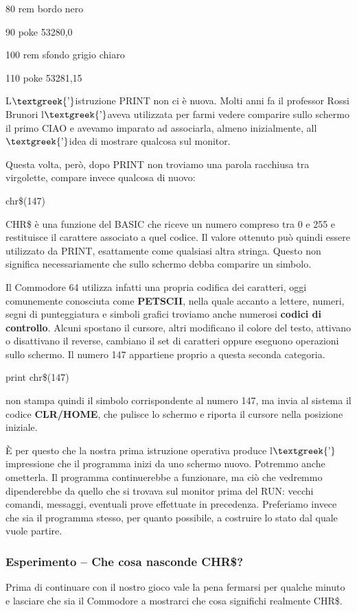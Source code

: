 \documentclass{article}
\begin{document}
80 rem bordo nero

90 poke 53280,0

100 rem sfondo grigio chiaro

110 poke 53281,15

L$\text{\textgreek{’}}$istruzione PRINT non ci è nuova. Molti anni fa il professor Rossi Brunori
l$\text{\textgreek{’}}$aveva utilizzata per farmi vedere comparire sullo schermo il primo CIAO e avevamo imparato ad
associarla, almeno inizialmente, all$\text{\textgreek{’}}$idea di mostrare qualcosa sul monitor.

Questa volta, però, dopo PRINT non troviamo una parola racchiusa tra virgolette, compare invece qualcosa di nuovo:

chr\$(147)

CHR\$ è una funzione del BASIC che riceve un numero compreso tra 0 e 255 e restituisce il carattere associato a quel
codice. Il valore ottenuto può quindi essere utilizzato da PRINT, esattamente come qualsiasi altra stringa. Questo non
significa necessariamente che sullo schermo debba comparire un simbolo.

Il Commodore 64 utilizza infatti una propria codifica dei caratteri, oggi comunemente conosciuta come \textbf{PETSCII},
nella quale accanto a lettere, numeri, segni di punteggiatura e simboli grafici troviamo anche numerosi \textbf{codici
di controllo}. Alcuni spostano il cursore, altri modificano il colore del testo, attivano o disattivano il reverse,
cambiano il set di caratteri oppure eseguono operazioni sullo schermo. Il numero 147 appartiene proprio a questa
seconda categoria.

print chr\$(147)

non stampa quindi il simbolo corrispondente al numero 147, ma invia al sistema il codice \textbf{CLR/HOME}, che pulisce
lo schermo e riporta il cursore nella posizione iniziale. 

È per questo che la nostra prima istruzione operativa produce l$\text{\textgreek{’}}$impressione che il programma inizi
da uno schermo nuovo. Potremmo anche ometterla. Il programma continuerebbe a funzionare, ma ciò che vedremmo
dipenderebbe da quello che si trovava sul monitor prima del RUN: vecchi comandi, messaggi, eventuali prove effettuate
in precedenza. Preferiamo invece che sia il programma stesso, per quanto possibile, a costruire lo stato dal quale
vuole partire.

\subsubsection{Esperimento – Che cosa nasconde CHR\$?}
Prima di continuare con il nostro gioco vale la pena fermarsi per qualche minuto e lasciare che sia il Commodore a
mostrarci che cosa significhi realmente CHR\$.
\end{document}
